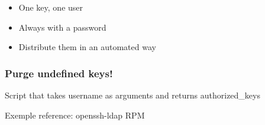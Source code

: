 \begin{frame}[fragile]

\begin{itemize}
    \item One key, one user
    \item Always with a password
    \item Distribute them in an automated way
\end{itemize}
\end{frame}
\begin{frame}[fragile]

\end{frame}
\begin{frame}[fragile]
    
\end{frame}
\begin{frame}[fragile]
    
\end{frame}
\begin{frame}[fragile]
    \frametitle{Purge undefined keys!}
    
\end{frame}
\begin{iframe}[AuthorizedKeysCommand]
\item Script that takes username as arguments and returns authorized_keys
\item Exemple reference: openssh-ldap RPM
\end{iframe}

